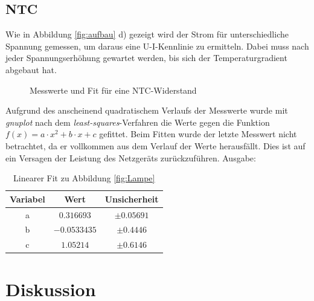 \subsection{NTC}
Wie in Abbildung \ref{fig:aufbau} d) gezeigt wird der Strom für unterschiedliche Spannung gemessen, um daraus eine U-I-Kennlinie zu ermitteln. Dabei muss nach jeder Spannungserhöhung gewartet werden, bis sich der Temperaturgradient abgebaut hat. 

\begin{figure}[H]
\centering
{}
\caption{Messwerte und Fit für eine NTC-Widerstand}
\label{fig:ntc}
\end{figure}
Aufgrund des anscheinend quadratischem Verlaufs der Messwerte wurde mit \emph{gnuplot} nach dem \emph{least-squares}-Verfahren die Werte gegen die Funktion $f(x)=a\cdot x^2+b\cdot x+c$ gefittet. Beim Fitten wurde der letzte Messwert nicht betrachtet, da er vollkommen aus dem Verlauf der Werte herausfällt. Dies ist auf ein Versagen der Leistung des Netzgeräts zurückzuführen. Ausgabe:
\begin{table}[H]
  \centering
  \begin{tabular}{c | c | c }
    Variabel   & Wert & Unsicherheit\\ \hline
    a & $\num{0,316693}$ & $\pm\num{0,05691}$ \\
    b & $\num{-0,0533435}$ & $\pm\num{0,4446}$ \\
    c & $\num{1,05214}$ & $\pm\num{0,6146}$ \\
  \end{tabular}
  \caption{Linearer Fit zu Abbildung \ref{fig:Lampe}}
  \label{tab:fitlampe}
\end{table}


\section{Diskussion}
